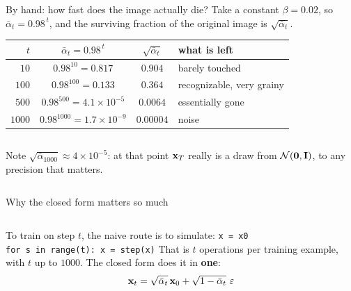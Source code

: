 \documentclass[aspectratio=169]{beamer}
\begin{document}
\begin{frame}{By hand: how fast does the image actually die?}
  \small
  Take a constant $\beta = 0.02$, so $\bar\alpha_t = 0.98^{\,t}$, and the surviving
  fraction of the original image is $\sqrt{\bar\alpha_t}$.
  \vskip 6pt
  \begin{center}\footnotesize
    \begin{tabular}{r|c|c|l}
      $t$ & $\bar\alpha_t = 0.98^{\,t}$ & $\sqrt{\bar\alpha_t}$ & what is left \\\hline
      $10$   & $0.98^{10} = 0.817$      & $0.904$ & barely touched \\
      $100$  & $0.98^{100} = 0.133$     & $0.364$ & recognizable, very grainy \\
      $500$  & $0.98^{500} = 4.1\times10^{-5}$ & $0.0064$ & essentially gone \\
      $1000$ & $0.98^{1000} = 1.7\times10^{-9}$ & $0.00004$ & noise \\
    \end{tabular}
  \end{center}
  \vskip 6pt
  \begin{columns}[T]
    \footnotesize
    Note $\sqrt{\bar\alpha_{1000}} \approx 4\times 10^{-5}$: at that point $\mathbf{x}_T$ really
    is a draw from $\mathcal{N}(\mathbf{0},\mathbf{I})$, to any precision that matters.
  \end{columns}
\end{frame}

\begin{frame}{Why the closed form matters so much}
  \small
  \begin{columns}[T]
    To train on step $t$, the naive route is to simulate:
    \vskip 3pt
    {\footnotesize
    \texttt{x = x0}\\
    \texttt{for s in range(t): x = step(x)}}
    \vskip 6pt
    That is $t$ operations per training example, with $t$ up to $1000$.
    \vskip 6pt
    The closed form does it in \textbf{one}:
    \[ \mathbf{x}_t = \sqrt{\bar\alpha_t}\,\mathbf{x}_0 + \sqrt{1-\bar\alpha_t}\ \varepsilon \]
  \end{columns}
\end{frame}
\end{document}
